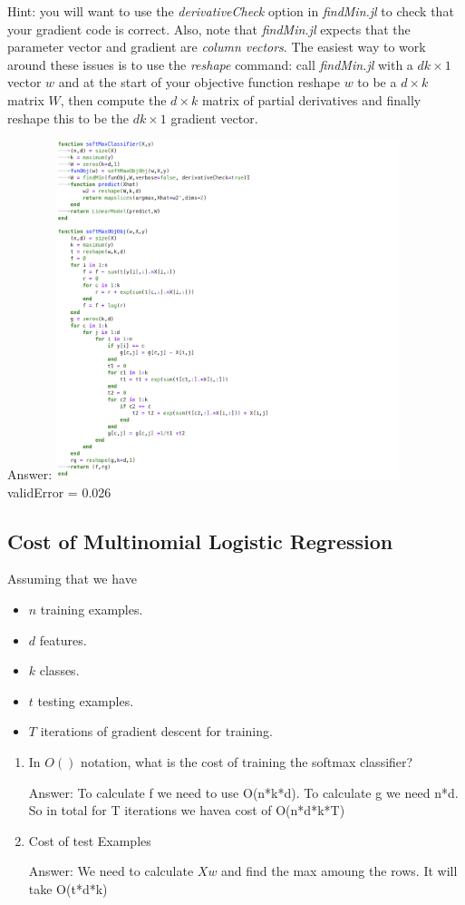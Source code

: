 \documentclass{article}
\def\ans#1{\par\gre{Answer: #1}}
\def\blu#1{{\color{blu}#1}}
\def\gre#1{{\color{gre}#1}}
\def\items#1{\begin{itemize}#1\end{itemize}}
\def\enum#1{\begin{enumerate}#1\end{enumerate}}
\begin{document}
Hint: you will want to use the \emph{derivativeCheck} option in \emph{findMin.jl} to check that your gradient code is correct. Also, note that \emph{findMin.jl} expects that the parameter vector and gradient are \emph{column vectors}. The easiest way to work around these issues is to use the \emph{reshape} command: call \emph{findMin.jl} with a $dk \times 1$ vector $w$ and at the start of your objective function reshape $w$ to be a $d \times k$ matrix $W$, then compute the $d \times k$ matrix of partial derivatives and finally reshape this to be the $dk \times 1$ gradient vector.
\ans{\includegraphics[width=10cm]{Q33Code.png} \\ validError = 0.026}
\subsection{Cost of Multinomial Logistic Regression}

Assuming that we have
\items{
\item $n$ training examples.
\item $d$ features.
\item $k$ classes.
\item $t$ testing examples.
\item $T$ iterations of gradient descent for training.
}
\blu{\enum{
\item In $O()$ notation, what is the cost of training the softmax classifier?
\ans{ To calculate f we need to use O(n*k*d). To calculate g we need n*d. So in total for T iterations we havea cost of O(n*d*k*T)}
\item Cost of test Examples
\ans{We need to calculate $Xw$ and find the max amoung the rows. It will take O(t*d*k)}
}}
\end{document}
